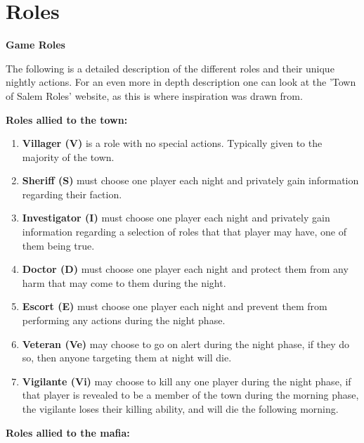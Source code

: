 \section{Roles}\label{app:A}
\begin{center}
	\textbf{Game Roles}
\end{center}
The following is a detailed description of the
different roles and their unique nightly actions. For
an even more in depth description one can look at the
'Town of Salem Roles' website, as this is where
inspiration was drawn from\cite{TownOfSalemRoles}.

\textbf{Roles allied to the town:}
\begin{enumerate}
	\item\textbf{Villager (V)} is a  role with no special actions. Typically
	      given
	      to the majority of the town.
	\item\textbf{Sheriff (S)} must choose one player each night and privately
	      gain
	      information regarding their faction.
	\item\textbf{Investigator (I)} must choose one player each night and
	      privately
	      gain information regarding a selection of roles that that player may have,
	      one of them being true.
	\item\textbf{Doctor (D)} must choose one player each night and protect them
	      from any harm that may come to them during the night.
	\item\textbf{Escort (E)} must choose one player each night and prevent them
	      from performing any actions during the night phase.
	\item\textbf{Veteran (Ve)} may choose to go on alert during the night
	      phase, if
	      they do so, then anyone targeting them at night will die.
	\item\textbf{Vigilante (Vi)} may choose to kill any one player during the
	      night
	      phase, if that player is revealed to be a member of the town during the
	      morning phase, the vigilante loses their killing ability, and will die the
	      following morning.
\end{enumerate}
\textbf{Roles allied to the mafia:}
